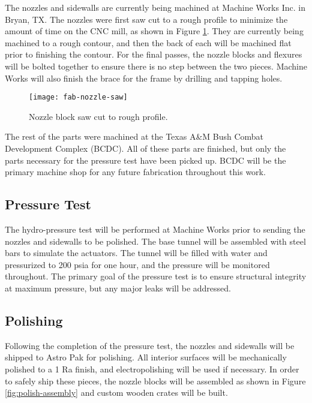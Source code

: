 The nozzles and sidewalls are currently being machined at Machine Works Inc. in Bryan, TX. The nozzles were first saw cut to a rough profile to minimize the amount of time on the CNC mill, as shown in Figure \ref{fig:fab-nozzle-saw}. They are currently being machined to a rough contour, and then the back of each will be machined flat prior to finishing the contour. For the final passes, the nozzle blocks and flexures will be bolted together to ensure there is no step between the two pieces. Machine Works will also finish the brace for the frame by drilling and tapping holes.

\begin{figure}[ht!]
    \centering
    \texttt{[image: fab-nozzle-saw]}
    \caption{Nozzle block saw cut to rough profile.}
    \label{fig:fab-nozzle-saw}
\end{figure}

The rest of the parts were machined at the Texas A\&M Bush Combat Development Complex (BCDC). All of these parts are finished, but only the parts necessary for the pressure test have been picked up. BCDC will be the primary machine shop for any future fabrication throughout this work.

\subsection{Pressure Test}

The hydro-pressure test will be performed at Machine Works prior to sending the nozzles and sidewalls to be polished. The base tunnel will be assembled with steel bars to simulate the actuators. The tunnel will be filled with water and pressurized to 200 psia for one hour, and the pressure will be monitored throughout. The primary goal of the pressure test is to ensure structural integrity at maximum pressure, but any major leaks will be addressed.

\subsection{Polishing}

Following the completion of the pressure test, the nozzles and sidewalls will be shipped to Astro Pak for polishing. All interior surfaces will be mechanically polished to a 1 Ra finish, and electropolishing will be used if necessary. In order to safely ship these pieces, the nozzle blocks will be assembled as shown in Figure \ref{fig:polish-assembly} and custom wooden crates will be built.


